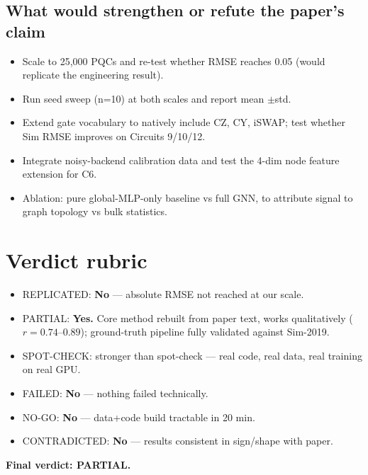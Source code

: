 \documentclass[11pt]{article}
\begin{document}
\subsection{What would strengthen or refute the paper's claim}
\begin{itemize}
  \item Scale to 25{,}000 PQCs and re-test whether RMSE reaches 0.05
    (would replicate the engineering result).
  \item Run seed sweep (n=10) at both scales and report mean \(\pm\)std.
  \item Extend gate vocabulary to natively include CZ, CY, iSWAP; test
    whether Sim RMSE improves on Circuits 9/10/12.
  \item Integrate noisy-backend calibration data and test the 4-dim node
    feature extension for C6.
  \item Ablation: pure global-MLP-only baseline vs full GNN, to attribute
    signal to graph topology vs bulk statistics.
\end{itemize}

\section{Verdict rubric}
\begin{itemize}
  \item REPLICATED: \textbf{No} --- absolute RMSE not reached at our scale.
  \item PARTIAL: \textbf{Yes.} Core method rebuilt from paper text, works
    qualitatively (\(r\!=\!0.74\text{--}0.89\)); ground-truth pipeline
    fully validated against Sim-2019.
  \item SPOT-CHECK: stronger than spot-check --- real code, real data,
    real training on real GPU.
  \item FAILED: \textbf{No} --- nothing failed technically.
  \item NO-GO: \textbf{No} --- data+code build tractable in 20 min.
  \item CONTRADICTED: \textbf{No} --- results consistent in sign/shape
    with paper.
\end{itemize}
\textbf{Final verdict: PARTIAL.}
\end{document}
